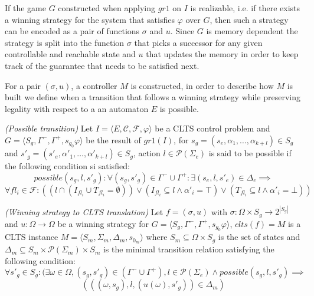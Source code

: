 If the game $G$ constructed when applying $gr1$ on $I$ is realizable, i.e. if there exists a winning strategy for the system that satisfies $\varphi$ over $G$, then such a strategy can be encoded as a pair of functions $\sigma
$ and $u$. Since $G$ is memory dependent the strategy is split into the function $\sigma$ that picks a successor for any given controllable and reachable state  and $u$ that updates the memory in order to keep track of the guarantee that needs to be satisfied next. 

For a pair $(\sigma,u)$, a controller $M$ is constructed, in order to describe how $M$ is built we define when a transition that follows a winning strategy while preserving legality with respect to a an automaton $E$ is possible.

\begin{definition}\label{def:strat_possible_transition} \emph{(Possible transition)} 
	Let $I = \langle E, \mathcal{C}, \mathcal{F}, \varphi \rangle$ be a CLTS control problem and $G = \langle S_g, \Gamma^-,\Gamma^+,s_{g_0}\varphi \rangle$ be the result of $gr1(I)$, for $s_g=(s_e,\alpha_1,\ldots,\alpha_{k+l}) \in S_g$ and $s'_g=(s'_e,\alpha'_1,\ldots,\alpha'_{k+l}) \in S_g$, action $l \in \mathcal{P}(\Sigma_e)$ is said to be possible if the following condition si satisfied:
	\[possible(s_g,l,s'_g):\forall (s_g,s'_g) \in \Gamma^- \cup \Gamma^+: \exists (s_e,l,s'_e) \in \Delta_e \implies \]
	\[ \forall fl_i \in \mathcal{F}: ((l \cap (I_{fl_i} \cup T_{fl_i} = \emptyset)) \vee (I_{fl_i} \subseteq l \wedge \alpha'_i = \top)\vee (T_{fl_i} \subseteq l \wedge \alpha'_i = \bot))\]
\end{definition}

\begin{definition}\label{def:strat_to_clts_translation} \emph{(Winning strategy to CLTS translation)} 
	Let $f=(\sigma,u)$ with $\sigma:\Omega \times S_g \rightarrow 2^{|S_g|}$ and
	$u:\Omega \rightarrow \Omega$ be a winning strategy for $G = \langle S_g, \Gamma^-,\Gamma^+,s_{g_0}\varphi \rangle$, $clts(f)=M$ is a CLTS instance $M=\langle S_m, \Sigma_m, \Delta_m, s_{0_m}\rangle$ where $S_m \subseteq \Omega \times S_g$ is the set of states
	and $\Delta_m \subseteq S_m \times \mathcal{P}(\Sigma_m) \times S_m$ is the minimal transition relation satisfying the following condition:
	\[\forall s'_g \in S_g: (\exists \omega \in \Omega, (s_g,s'_g) \in (\Gamma^- \cup \Gamma^+), l \in \mathcal{P}(\Sigma_e) \wedge possible(s_g,l,s'_g) \implies \] \[(((\omega,s_g),l,(u(\omega),s'_g))\in \Delta_m) \]
\end{definition}